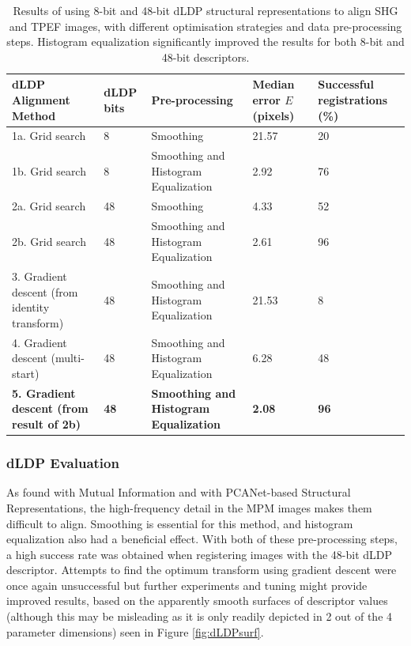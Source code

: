 \documentclass{report}
\begin{document}
\begin{table}
\centering

\begin{tabular}{|p{1.2in}|p{0.4in}|p{1.05in}|p{0.6in}|p{0.9in}|}
\hline
\textbf{dLDP Alignment Method} & \textbf{dLDP bits} & \textbf{Pre-processing} & \textbf{Median error $E$ (pixels)} & \textbf{Successful registrations (\%)} \\
\hline
\hline
1a. Grid search & 8 & Smoothing & 21.57 & 20  \\ %
\hline
1b. Grid search & 8 & Smoothing and Histogram Equalization & 2.92 & 76  \\ %
\hline
2a. Grid search & 48 & Smoothing & 4.33 & 52  \\ %
\hline
2b. Grid search & 48 & Smoothing and Histogram Equalization & 2.61 & 96  \\ %
\hline
3. Gradient descent (from identity transform) & 48 & Smoothing and Histogram Equalization & 21.53  & 8 \\  %
\hline
4. Gradient descent (multi-start) & 48 & Smoothing and Histogram Equalization & 6.28  & 48 \\  %
\hline
\textbf{5. Gradient descent (from result of 2b)} & \textbf{48} & \textbf{Smoothing and Histogram Equalization} & \textbf{2.08}  & \textbf{96} \\  %
\hline
\end{tabular}
\caption{Results of using 8-bit and 48-bit dLDP structural representations to align SHG and TPEF images, with different optimisation strategies and data pre-processing steps. Histogram equalization significantly improved the results for both 8-bit and 48-bit descriptors.}
\label{tab:dLDPresults}
\end{table}



\subsubsection{dLDP Evaluation}
As found with Mutual Information and with PCANet-based Structural Representations, the high-frequency detail in the MPM images makes them difficult to align. Smoothing is essential for this method, and histogram equalization also had a beneficial effect. With both of these pre-processing steps, a high success rate was obtained when registering images with the 48-bit dLDP descriptor. Attempts to find the optimum transform using gradient descent were once again unsuccessful but further experiments and tuning might provide improved results, based on the apparently smooth surfaces of descriptor values (although this may be misleading as it is only readily depicted in 2 out of the 4 parameter dimensions) seen in Figure \ref{fig:dLDPsurf}.
\end{document}
